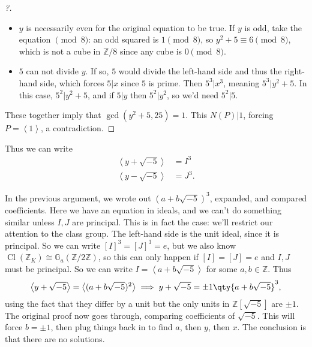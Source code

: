 \begin{example}[?]
\begin{proof}[?]
\begin{itemize}
\item
  \(y\) is necessarily even for the original equation to be true. If
  \(y\) is odd, take the equation \(\pmod 8\): an odd squared is
  \(1\pmod 8\), so \(y^2 +5 \equiv 6 \pmod 8\), which is not a cube in
  \({\mathbb{Z}}/8\) since any cube is \(0\pmod 8\).
\item
  \(5\) can not divide \(y\). If so, \(5\) would divide the left-hand
  side and thus the right-hand side, which forces \(5\mathrel{\Big|}x\)
  since \(5\) is prime. Then \(5^3 \mathrel{\Big|}x^3\), meaning
  \(5^3 \mathrel{\Big|}y^2 + 5\). In this case,
  \(5^2 \mathrel{\Big|}y^2 + 5\), and if \(5\mathrel{\Big|}y\) then
  \(5^2 \mathrel{\Big|}y^2\), so we'd need \(5^2 \mathrel{\Big|}5\).
\end{itemize}

These together imply that \(\gcd(y^2 + 5, 25) = 1\). This
\(N(P) \mathrel{\Big|}1\), forcing
\(P = \left\langle{ 1 }\right\rangle\), a contradiction.

\end{proof}

Thus we can write
\begin{align*}
\left\langle{ y + \sqrt{-5} }\right\rangle  &= I^3 \\
\left\langle{ y - \sqrt{-5} }\right\rangle  &= J^3
.\end{align*}

In the previous argument, we wrote out \((a + b \sqrt{-5} )^3\),
expanded, and compared coefficients. Here we have an equation in ideals,
and we can't do something similar unless \(I, J\) are principal. This is
in fact the case: we'll restrict our attention to the class group. The
left-hand side is the unit ideal, since it is principal. So we can write
\([I]^3 = [J]^3 = e\), but we also know
\(\operatorname{Cl}({\mathbb{Z}}_K) \cong {\mathbb{G}}_a({\mathbb{Z}}/2{\mathbb{Z}})\),
so this can only happen if \([I] = [J] = e\) and \(I, J\) must be
principal. So we can write
\(I = \left\langle{ a + b \sqrt{-5}}\right\rangle\) for some
\(a, b \in {\mathbb{Z}}\). Thus
\begin{align*}
\left\langle{ y + \sqrt{-5} }\right\rangle = \left\langle{ (a + b \sqrt{-5} )^2 }\right\rangle \implies y + \sqrt{-5} = \pm 1 \qty { a + b \sqrt{-5} }^3  
,\end{align*}
using the fact that they differ by a unit but the only units in
\({\mathbb{Z}}[ \sqrt{-5} ]\) are \(\pm 1\). The original proof now goes
through, comparing coefficients of \(\sqrt{-5}\). This will force
\(b = \pm 1\), then plug things back in to find \(a\), then \(y\), then
\(x\). The conclusion is that there are no solutions.

\end{example}

